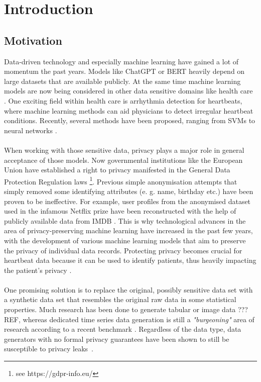 \section{Introduction}

\subsection{Motivation}

Data-driven technology and especially machine learning have gained a lot of momentum the past years. Models like ChatGPT or BERT heavily depend on large datasets that are available publicly. At the same time machine learning models are now being considered in other data sensitive domains like health care \parencite[see][]{ai_and_med,aimed2,aimed3,aimed4}. One exciting field within health care is arrhythmia detection for heartbeats, where machine learning methods can aid physicians to detect irregular heartbeat conditions. Recently, several methods have been proposed, ranging from SVMs to neural networks \parencite[see review][]{arr_rev}.

\paragraph{}
When working with those sensitive data, privacy plays a major role in general acceptance of those models. Now governmental institutions like the European Union have established a right to privacy manifested in the General Data Protection Regulation laws \footnote[1]{see https://gdpr-info.eu/}. Previous simple anonymisation attempts that simply removed some identifying attributes (e. g. name, birthday etc.) have been proven to be ineffective. For example, user profiles from the anonymised dataset used in the infamous Netflix prize have been reconstructed with the help of publicly available data from IMDB \cite{4531148}. This is why technological advances in the area of privacy-preserving machine learning have increased in the past few years, with the development of various machine learning models that aim to preserve the privacy of individual data records. Protecting privacy becomes crucial for heartbeat data because it can be used to identify patients, thus heavily impacting the patient's privacy \parencite[see heartbeat biometrics][]{heartb_auth,hegde2011heartbeat}.

\paragraph{}
One promising solution \parencite[see][]{jordon2022synthetic} is to replace the original, possibly sensitive data set with a synthetic data set that resembles the original raw data in some statistical properties. Much research has been done to generate tabular or image data ???REF, whereas dedicated time series data generation is still a \textit{"burgeoning"} area of research according to a recent benchmark \parencite[][]{ang2023tsgbench}. Regardless of the data type, data generators with no formal privacy guarantees have been shown to still be susceptible to privacy leaks~\cite{stadler2022synthetic}. 

